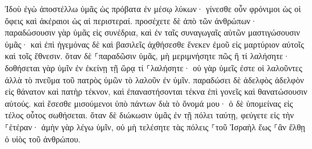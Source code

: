 \documentclass{openreader}
\begin{document}
Ἰδοὺ ἐγὼ ἀποστέλλω ὑμᾶς ὡς πρόβατα ἐν μέσῳ λύκων· γίνεσθε οὖν φρόνιμοι ὡς οἱ ὄφεις καὶ ἀκέραιοι ὡς αἱ περιστεραί. 
προσέχετε δὲ ἀπὸ τῶν ἀνθρώπων· παραδώσουσιν γὰρ ὑμᾶς εἰς συνέδρια, καὶ ἐν ταῖς συναγωγαῖς αὐτῶν μαστιγώσουσιν ὑμᾶς· 
καὶ ἐπὶ ἡγεμόνας δὲ καὶ βασιλεῖς ἀχθήσεσθε ἕνεκεν ἐμοῦ εἰς μαρτύριον αὐτοῖς καὶ τοῖς ἔθνεσιν. 
ὅταν δὲ ⸀παραδῶσιν ὑμᾶς, μὴ μεριμνήσητε πῶς ἢ τί λαλήσητε· δοθήσεται γὰρ ὑμῖν ἐν ἐκείνῃ τῇ ὥρᾳ τί ⸀λαλήσητε· 
οὐ γὰρ ὑμεῖς ἐστε οἱ λαλοῦντες ἀλλὰ τὸ πνεῦμα τοῦ πατρὸς ὑμῶν τὸ λαλοῦν ἐν ὑμῖν. 
παραδώσει δὲ ἀδελφὸς ἀδελφὸν εἰς θάνατον καὶ πατὴρ τέκνον, καὶ ἐπαναστήσονται τέκνα ἐπὶ γονεῖς καὶ θανατώσουσιν αὐτούς. 
καὶ ἔσεσθε μισούμενοι ὑπὸ πάντων διὰ τὸ ὄνομά μου· ὁ δὲ ὑπομείνας εἰς τέλος οὗτος σωθήσεται. 
ὅταν δὲ διώκωσιν ὑμᾶς ἐν τῇ πόλει ταύτῃ, φεύγετε εἰς τὴν ⸀ἑτέραν· ἀμὴν γὰρ λέγω ὑμῖν, οὐ μὴ τελέσητε τὰς πόλεις ⸀τοῦ Ἰσραὴλ ἕως ⸀ἂν ἔλθῃ ὁ υἱὸς τοῦ ἀνθρώπου. 
\end{document}
